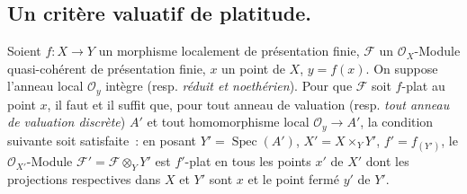 \subsection{Un critère valuatif de platitude.}
\label{subsection:IV.11.8-fr}

\begin{theorem}[11.8.1]
\label{IV.11.8.1-fr}
Soient $f:X\to Y$ un morphisme localement de présentation finie, $\mathcal F$ un
$\mathcal O_X$-Module quasi-cohérent de présentation finie, $x$ un point de
$X$, $y=f(x)$. On suppose l'anneau local $\mathcal O_y$ intègre \textup{(resp. \emph{réduit et
noethérien})}. Pour que $\mathcal F$ soit $f$-plat au point $x$, il faut et il
suffit que, pour tout anneau de valuation \textup{(resp. \emph{tout anneau de valuation
discrète})} $A'$ et tout homomorphisme local $\mathcal O_y\to A'$, la condition
suivante soit satisfaite~: en posant $Y'=\operatorname{Spec}(A')$,
$X'=X\times_Y Y'$, $f'=f_{(Y')}$, le $\mathcal O_{X'}$-Module
$\mathcal F'=\mathcal F\otimes_Y Y'$ est $f'$-plat en tous les points $x'$ de
$X'$ dont les projections respectives dans $X$ et $Y'$ sont $x$ et le point
fermé $y'$ de $Y'$.
\end{theorem}

